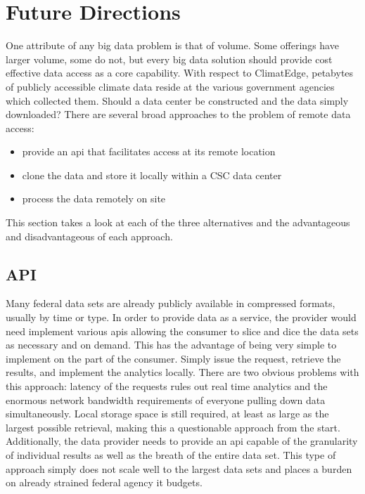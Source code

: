 \section{Future Directions}
One attribute of any big data problem is that of volume. Some offerings have larger volume, some do not, but every big data solution should provide cost effective data access as a core capability. With respect to ClimatEdge\texttrademark{}, petabytes of publicly accessible climate data reside at the various government agencies which collected them. Should a data center be constructed and the data simply downloaded? There are several broad approaches to the problem of remote data access:
\begin{itemize}
    \item provide an \gls{api} that facilitates access at its remote location
    \item clone the data and store it locally within a \textsc{CSC} data center
    \item process the data remotely on site
\end{itemize}
This section takes a look at each of the three alternatives and the advantageous and disadvantageous of each approach.
\subsection{API}
Many federal data sets are already publicly available in compressed formats, usually by time or type. In order to provide data as a service, the provider would need implement various \gls{api}s allowing the consumer to slice and dice the data sets as necessary and on demand. This has the advantage of being very simple to implement on the part of the consumer. Simply issue the request, retrieve the results, and implement the analytics locally. There are two obvious problems with this approach: latency of the requests rules out real time analytics and the enormous network bandwidth requirements of everyone pulling down data simultaneously. Local storage space is still required, at least as large as the largest possible retrieval, making this a questionable approach from the start. Additionally, the data provider needs to provide an \gls{api} capable of the granularity of individual results as well as the breath of the entire data set. This type of approach simply does not scale well to the largest data sets and places a burden on already strained federal agency \gls{it} budgets.
